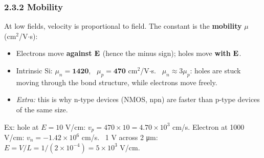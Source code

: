     \subsubsection{2.3.2 Mobility}
    At low fields, velocity is proportional to field. The constant is the \textbf{mobility} $\mu$ (cm$^2$/V$\cdot$s): 
    \begin{itemize}
        \item Electrons move \textbf{against} $\mathbf{E}$ (hence the minus sign); holes move \textbf{with} $\mathbf{E}$.
        \item Intrinsic Si: $\mu_n = \mathbf{1420}$, \ $\mu_p = \mathbf{470}$ cm$^2$/V$\cdot$s. \ $\mu_n \approx 3\mu_p$: holes are stuck moving through the bond structure, while electrons move freely.
        \item \textit{Extra:} this is why n-type devices (NMOS, npn) are faster than p-type devices of the same size.
    \end{itemize}
    Ex: hole at $E = 10$ V/cm: $v_p = 470\times10 = 4.70\times10^3$ cm/s. Electron at 1000 V/cm: $v_n = -1.42\times10^6$ cm/s. \ 1 V across 2 \si{\micro\metre}: $E = V/L = 1/(2\times10^{-4}) = 5\times10^3$ V/cm. 

